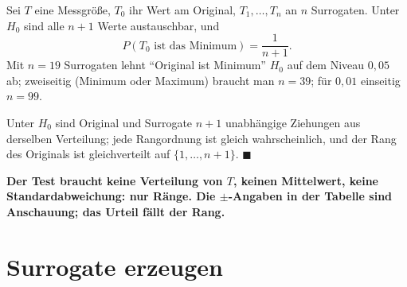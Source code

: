 \begin{merksatz}
Sei $T$ eine Messgröße, $T_0$ ihr Wert am Original, $T_1, \ldots, T_n$ an $n$ Surrogaten. Unter $H_0$ sind alle $n + 1$ Werte austauschbar, und
\[ P(T_0 \text{ ist das Minimum}) = \frac{1}{n+1} . \]
Mit $n = 19$ Surrogaten lehnt \enquote{Original ist Minimum} $H_0$ auf dem Niveau $0{,}05$ ab; zweiseitig (Minimum oder Maximum) braucht man $n = 39$; für $0{,}01$ einseitig $n = 99$.

Unter $H_0$ sind Original und Surrogate $n + 1$ unabhängige Ziehungen aus derselben Verteilung; jede Rangordnung ist gleich wahrscheinlich, und der Rang des Originals ist gleichverteilt auf $\{1, \ldots, n+1\}$. $\blacksquare$

\begin{center}
\begin{minipage}{0.9\textwidth}
\textbf{Der Test braucht keine Verteilung von $T$, keinen Mittelwert, keine Standardabweichung: nur Ränge. Die $\pm$-Angaben in der Tabelle sind Anschauung; das Urteil fällt der Rang.}
\end{minipage}
\end{center}

\begin{center}
\begin{minipage}{0.88\textwidth}
\end{minipage}
\end{center}
\end{merksatz}

\section{Surrogate erzeugen}

